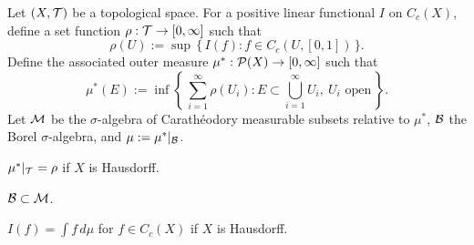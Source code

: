 \documentclass{../../large}
\begin{document}
\begin{prb}
Let $(X,\mathcal{T})$ be a topological space.
For a positive linear functional $I$ on $C_c(X)$, define a set function $\rho:\mathcal{T}\to[0,\infty]$ such that
\[\rho(U):=\sup\,\{\,I(f):f\in C_c(U,[0,1])\,\}.\]
Define the associated outer measure $\mu^*:\mathcal{P}(X)\to[0,\infty]$ such that
\[\mu^*(E):=\inf\left\{\,\sum_{i=1}^\infty\rho(U_i):E\subset\bigcup_{i=1}^\infty U_i,\ U_i\text{ open}\,\right\}.\]
Let $\mathcal{M}$ be the $\sigma$-algebra of Carath\'eodory measurable subsets relative to $\mu^*$, $\mathcal{B}$ the Borel $\sigma$-algebra, and $\mu:=\mu^*|_{\mathcal{B}}$.
\begin{parts}
\item $\mu^*|_{\mathcal{T}}=\rho$ if $X$ is Hausdorff.
\item $\mathcal{B}\subset\mathcal{M}$.
\item $I(f)=\int f\,d\mu$ for $f\in C_c(X)$ if $X$ is Hausdorff.
\end{parts}
\end{prb}
\end{document}
